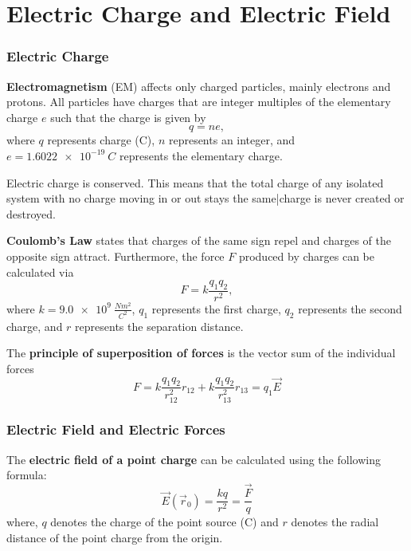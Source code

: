 
\chapter{Electric Charge and Electric Field}

\subsection{Electric Charge}
\textbf{Electromagnetism} (EM) affects only charged particles, mainly electrons and protons. All particles have charges that are integer multiples of the elementary charge $e$ such that the charge is given by
\begin{equation}
q = ne,
\end{equation}
where $q$ represents charge (C), $n$ represents an integer, and $e = \SI{1.6022e-19}{C}$ represents the elementary charge.

Electric charge is conserved. This means that the total charge of any isolated system with no charge moving in or out stays the same|charge is never created or destroyed. 

\textbf{Coulomb's Law} states that charges of the same sign repel and charges of the opposite sign attract. Furthermore, the force $F$ produced by charges can be calculated via
\begin{equation}
F = k\frac{q_1q_2}{r^2},
\end{equation}
where $k = \SI{9.0e9}{\frac{N m^2}{C^2}}$, $q_1$ represents the first charge, $q_2$ represents the second charge, and $r$ represents the separation distance.

The \textbf{principle of superposition of forces} is the vector sum of the individual forces
\begin{equation}
F = k\frac{q_1q_2}{r_{12}^2}r_{12} + k\frac{q_1q_2}{r_{13}^2}r_{13} = q_1 \vec{E}
\end{equation}
\newpage

\subsection{Electric Field and Electric Forces}

The \textbf{electric field of a point charge} can be calculated using the following formula:
\begin{equation}
\vec E (\vec r_0)= \frac{kq}{r^2} = \frac{\vec{F}}{q}
\end{equation}
where, $q$ denotes the charge of the point source (C) and $r$ denotes the radial distance of the point charge from the origin.

